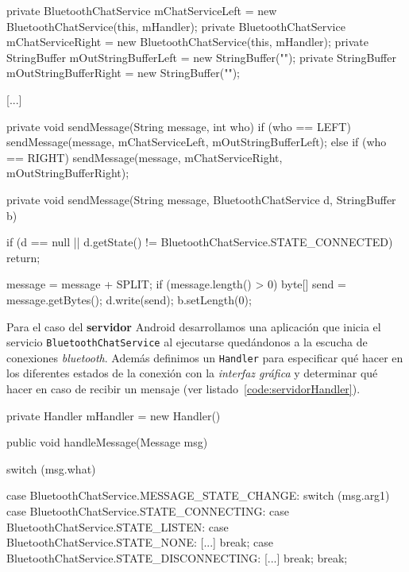 \begin{definitionlist}
\begin{listing}[
  float=ht,
  language = java,
  caption  = {Métodos utilizados para enviar mensajes por bluetooth haciendo uso de la clase
               \texttt{BluetoothChatServide}},
  label    = code:sendMessage]
private BluetoothChatService mChatServiceLeft = 
    new BluetoothChatService(this, mHandler);
private BluetoothChatService mChatServiceRight =
    new BluetoothChatService(this, mHandler);
private StringBuffer mOutStringBufferLeft = new StringBuffer("");
private StringBuffer mOutStringBufferRight = new StringBuffer("");

[...]

private void sendMessage(String message, int who) {
    if (who == LEFT) {
      sendMessage(message, mChatServiceLeft, mOutStringBufferLeft);
    } else if (who == RIGHT) {
      sendMessage(message, mChatServiceRight, mOutStringBufferRight);
    }
}

private void sendMessage(String message, BluetoothChatService d, StringBuffer b) {
    if (d == null || d.getState() != BluetoothChatService.STATE_CONNECTED) {
        return;
    }
    	
    message = message + SPLIT;
    if (message.length() > 0) {
        byte[] send = message.getBytes();
        d.write(send);
        b.setLength(0);
    }
}
\end{listing}

    Para el caso del \textbf{servidor} Android desarrollamos una aplicación que inicia el servicio
    \texttt{BluetoothChatService} al ejecutarse quedándonos a la escucha de conexiones
    \emph{bluetooth}. Además definimos un \texttt{Handler} para especificar qué hacer en los
    diferentes estados de la conexión con la \emph{interfaz gráfica} y determinar qué hacer en caso
    de recibir un mensaje (ver listado~\ref{code:servidorHandler}).

\begin{listing}[
  float=ht,
  language = java,
  caption  = {Métodos utilizados en los servidores para leer los mensajes recibidos por medio de
               la clase \texttt{BluetoothChatServide} },
  label    = code:servidorHandler]
private Handler mHandler = new Handler() {
  public void handleMessage(Message msg) {
    switch (msg.what) {
      case BluetoothChatService.MESSAGE_STATE_CHANGE:
        switch (msg.arg1) {
          case BluetoothChatService.STATE_CONNECTING:
          case BluetoothChatService.STATE_LISTEN:
          case BluetoothChatService.STATE_NONE:
            [...]
            break;
          case  BluetoothChatService.STATE_DISCONNECTING:
            [...]
            break;
        }
        break;

}}}
\end{listing}
\end{definitionlist}
